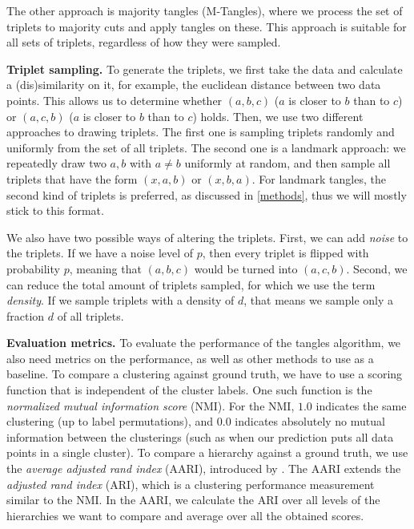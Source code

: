 The other approach is majority tangles (M-Tangles), where we process the set of triplets to majority cuts and apply tangles on these. This approach is suitable for all sets of triplets,
regardless of how they were sampled.

\textbf{Triplet sampling.}
To generate the triplets, we first take the data and calculate a (dis)similarity on it, for example, the euclidean distance between two data points. This allows
us to determine whether $(a,b,c)$ ($a$ is closer to $b$ than to $c$) or $(a,c,b)$ ($a$ is closer to $b$ than to $c$) holds.
Then, we use two different approaches to drawing triplets. The first one is sampling triplets randomly and uniformly from the set of all triplets. The second one is a landmark approach:
we repeatedly draw two $a,b$ with $a \neq b$ uniformly at random, and then sample all triplets that have the form $(x,a,b)$ or $(x,b,a)$. 
For landmark tangles, the second kind of triplets is preferred, as discussed in \autoref{methods}, thus we will mostly stick to this format. 

We also have two possible ways of altering the triplets. First, we can add \textit{noise}
to the triplets. If we have a noise level of $p$, then every triplet is flipped with probability $p$, meaning that $(a,b,c)$ would be turned into $(a,c,b)$. 
Second, we can reduce the total amount of triplets sampled, for which we use the term \textit{density}. 
If we sample triplets with a density of $d$, that means we sample only a fraction $d$ of all triplets. 

\noindent
\textbf{Evaluation metrics.}
To evaluate the performance of the tangles algorithm, we also need metrics on the performance, as well as other methods to use as a baseline. 
To compare a clustering against ground truth, we have to use a scoring function that is independent of the cluster labels. 
One such function is the \textit{normalized mutual information score} (NMI). 
For the NMI, $1.0$ indicates the same clustering (up to label permutations), and $0.0$ indicates absolutely no mutual information between the clusterings (such as when our prediction
puts all data points in a single cluster). To compare a hierarchy against a ground truth, we use the \textit{average adjusted rand index} (AARI), 
introduced by \cite{ghoshdastidarFoundationsComparisonBasedHierarchical2019}. The AARI extends the \textit{adjusted rand index} (ARI), which is a clustering performance measurement
similar to the NMI. In the AARI, we calculate the ARI over all levels of the hierarchies we want to compare and average over all the obtained scores. 
\\

